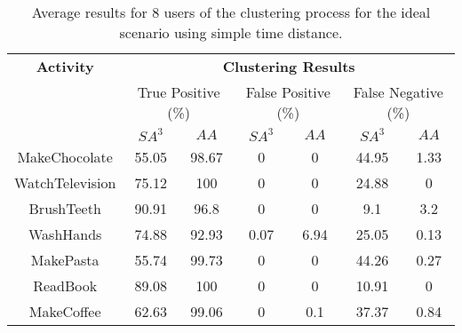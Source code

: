 \begin{table}[htbp]\scriptsize
    \begin{center}    
        \begin{tabular}{ccccccc}
            \hline            
            \textbf{Activity} & \multicolumn{6}{c}{\textbf{Clustering Results}} \\
             & \multicolumn{2}{c}{True Positive (\%)} & \multicolumn{2}{c}{False Positive (\%)} & \multicolumn{2}{c}{False Negative (\%)} \\
             & $SA^3$ & $AA$ & $SA^3$ & $AA$ & $SA^3$ & $AA$ \\
            \hline
            MakeChocolate   & 55.05 & 98.67 & 0    & 0    & 44.95 & 1.33 \\
	    WatchTelevision & 75.12 & 100   & 0    & 0    & 24.88 & 0    \\
	    BrushTeeth      & 90.91 & 96.8  & 0    & 0    & 9.1   & 3.2 \\
	    WashHands       & 74.88 & 92.93 & 0.07 & 6.94 & 25.05 & 0.13 \\
	    MakePasta       & 55.74 & 99.73 & 0    & 0    & 44.26 & 0.27 \\
	    ReadBook        & 89.08 & 100   & 0    & 0    & 10.91 & 0 \\
	    MakeCoffee      & 62.63 & 99.06 & 0    & 0.1  & 37.37 & 0.84 \\
            \hline
        \end{tabular}
        \caption{Average results for 8 users of the clustering process for the ideal scenario using simple time distance.}
        \label{tab-r-ideal-t1}
        \end{center}
\end{table}

